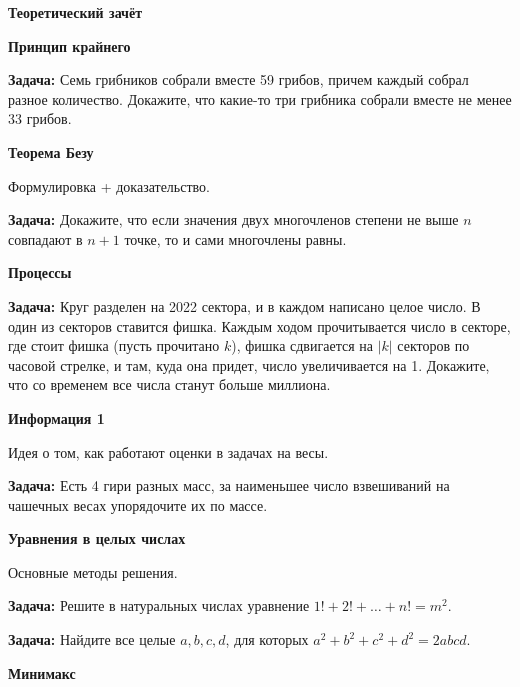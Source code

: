\documentclass{article}
\begin{document}
    \large

    \begin{center}
        \textbf{Теоретический зачёт}
    \end{center}

    \begin{enumerate_boxed}

        \item \textbf{Принцип крайнего}

        \textbf{Задача:} Семь грибников собрали вместе 59 грибов, причем каждый собрал разное количество.
        Докажите, что какие-то три грибника собрали вместе не менее 33 грибов.

        \item \textbf{Теорема Безу}

        Формулировка + доказательство.

        \textbf{Задача:} Докажите, что если значения двух многочленов степени не выше $n$ совпадают в $n+1$ точке, то и сами многочлены равны.

        \item \textbf{Процессы}

        \textbf{Задача:} Круг разделен на 2022 сектора, и в каждом написано целое число.
        В один из секторов ставится фишка.
        Каждым ходом прочитывается число в секторе, где стоит фишка (пусть прочитано $k$), фишка сдвигается на $|k|$ секторов по часовой стрелке, и там, куда она придет, число увеличивается на 1.
        Докажите, что со временем все числа станут больше миллиона.

        \item \textbf{Информация 1}

        Идея о том, как работают оценки в задачах на весы.


        \textbf{Задача:} Есть 4 гири разных масс, за наименьшее число взвешиваний на чашечных весах упорядочите их по массе.


        \item \textbf{Уравнения в целых числах    }

        Основные методы решения.

        \textbf{Задача:} Решите в натуральных числах уравнение   $1! + 2! + \dotsc + n! = m^2$.

        \textbf{Задача:} Найдите все целые $a, b, c, d$, для которых $a^2 +b^2 +c^2 +d^2 = 2abcd$.


        \item \textbf{Минимакс}


\end{enumerate_boxed}
\end{document}
